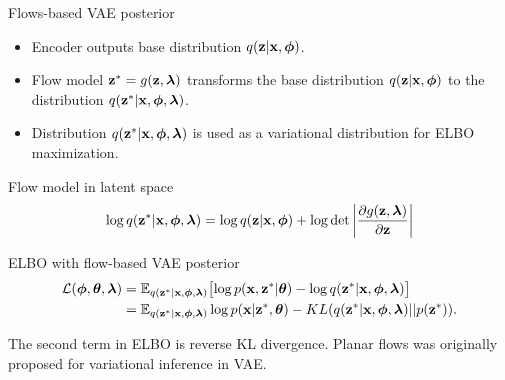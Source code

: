 \begin{frame}{Flows-based VAE posterior}
	\begin{itemize}
		\item Encoder outputs base distribution $q(\mathbf{z} | \mathbf{x}, \boldsymbol{\phi})$.
		\item Flow model $\mathbf{z}^* = g(\mathbf{z}, \boldsymbol{\lambda})$ transforms the base distribution $q(\mathbf{z} | \mathbf{x}, \boldsymbol{\phi})$ to the distribution $q(\mathbf{z}^* | \mathbf{x}, \boldsymbol{\phi}, \boldsymbol{\lambda})$.
		\item Distribution $q(\mathbf{z}^* | \mathbf{x}, \boldsymbol{\phi}, \boldsymbol{\lambda})$ is used as a variational distribution for ELBO maximization.
	\end{itemize}
	
	\begin{block}{Flow model in latent space}
		\vspace{-0.3cm}
		\[
			\log q(\mathbf{z}^* | \mathbf{x}, \boldsymbol{\phi}, \boldsymbol{\lambda}) = \log q(\mathbf{z} | \mathbf{x}, \boldsymbol{\phi}) + \log \det \left | \frac{\partial g(\mathbf{z}, \boldsymbol{\lambda})}{\partial \mathbf{z}}\right|
		\]
		\vspace{-0.3cm}
	\end{block}
	\begin{block}{ELBO with flow-based VAE posterior}
		\vspace{-0.5cm}
		\begin{align*}
			\mathcal{L} (\boldsymbol{\phi}, \boldsymbol{\theta}, \boldsymbol{\lambda})  
			&= \mathbb{E}_{q(\mathbf{z}^* | \mathbf{x}, \boldsymbol{\phi}, \boldsymbol{\lambda})} \bigl[\log p(\mathbf{x}, \mathbf{z}^* | \boldsymbol{\theta}) - \log q(\mathbf{z}^*| \mathbf{x}, \boldsymbol{\phi}, \boldsymbol{\lambda}) \bigr] \\ 
			&=  \mathbb{E}_{q(\mathbf{z}^* | \mathbf{x}, \boldsymbol{\phi}, \boldsymbol{\lambda})} \log p(\mathbf{x} | \mathbf{z}^*, \boldsymbol{\theta}) - KL (q(\mathbf{z}^* | \mathbf{x}, \boldsymbol{\phi}, \boldsymbol{\lambda}) || p(\mathbf{z}^*)).
		\end{align*}
		\vspace{-0.3cm}
	\end{block}
	The second term in ELBO is reverse KL divergence. Planar flows was originally proposed for variational inference in VAE.
	
\end{frame}
